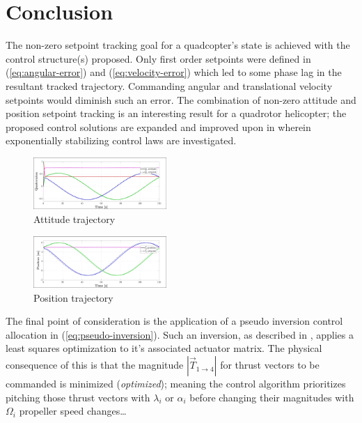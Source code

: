 \documentclass[a4paper, 10pt, conference]{ieeeconf}
\begin{document}
\section{Conclusion}
\label{sec:conclusion}
The non-zero setpoint tracking goal for a quadcopter's state is achieved with the control structure(s) proposed. Only first order setpoints were defined in (\ref{eq:angular-error}) and (\ref{eq:velocity-error}) which led to some phase lag in the resultant tracked trajectory. Commanding angular and translational velocity setpoints would diminish such an error. The combination of non-zero attitude and position setpoint tracking is an interesting result for a quadrotor helicopter; the proposed control solutions are expanded and improved upon in \cite{dualaxistilting} wherein exponentially stabilizing control laws are investigated.
\par
\begin{figure}[btp]
\vspace{-12pt}
\centering
\includegraphics[width=0.45\textwidth]{figs/attitude-trajectory}
\vspace{-8pt}
\caption{Attitude trajectory}
\label{fig:attitude-trajectory}
\end{figure}
\begin{figure}[tbp]
\vspace{-10pt}
\centering
\includegraphics[width=0.45\textwidth]{figs/position-trajectory}
\vspace{-8pt}
\caption{Position trajectory}
\label{fig:position-trajectory}
\end{figure}
\par
The final point of consideration is the application of a pseudo inversion control allocation in (\ref{eq:pseudo-inversion}). Such an inversion, as described in \cite{allocation}, applies a least squares optimization to it's associated actuator matrix. The physical consequence of this is that the magnitude $|\vec{T}_{1\rightarrow 4}|$ for thrust vectors to be commanded is minimized (\emph{optimized}); meaning the control algorithm prioritizes pitching those thrust vectors with $\lambda_i$ or $\alpha_i$ before changing their magnitudes with $\Omega_i$ propeller speed changes\ldots
\end{document}
